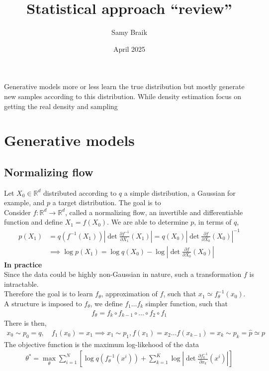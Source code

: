 \documentclass{article}
\title{Statistical approach ``review''}
\author{Samy Braik}
\date{April 2025}
\begin{document}
\maketitle

Generative models more or less learn the true distribution but mostly generate new samples according to this distribution. While density estimation focus on getting the real density and sampling 
\section{Generative models}
\subsection{Normalizing flow}
Let $X_0\in\mathbb{R}^d$ distributed according to $q$ a simple distribution, a Gaussian for example, and $p$ a target distribution.  The goal is to 
\\
Consider $f:\mathbb{R}^d\rightarrow\mathbb{R}^d$, called a normalizing flow, an invertible and differentiable function and define $X_1=f(X_0)$. 
We are able to determine \(p\), in terms of \(q\), 
\begin{align}
    p(X_1)&=q(f^{-1}(X_1))\left| \det\frac{\partial f^{-1}}{\partial X_1}(X_1) \right| = q(X_0)\left| \det \frac{\partial f}{\partial X_0}(X_0) \right|^{-1} \\
    &\implies \log p(X_1)=\log q(X_0) - \log \left|  \det \frac{\partial f}{\partial X_0}(X_0) \right|  
\end{align}
\textbf{In practice} \\
Since the data could be highly non-Gaussian in nature, such a transformation $f$ is intractable.\\
Therefore the goal is to learn $f_\theta$, approximation of $f$, such that $x_1 \simeq f_\theta^{-1}(x_0)$. \\
A structure is imposed to $f_\theta$, we define $f_1\ldots f_k$ simpler function,  such that
\begin{align}
    f_\theta = f_k\circ f_{k-1}\circ\ldots\circ f_2\circ f_1
\end{align}
There is then, 
\begin{align}
    x_0\sim p_0=q, \quad f_1(x_0) = x_1 \implies x_1\sim p_1, f(x_1)=x_2 \ldots f(x_{k-1})=x_k \sim p_k = \hat{p} \simeq p
\end{align}
The objective function is the maximum log-likehood of the data
\begin{align}
    \theta^* = \max_{\theta} \sum_{i=1}^N \left[ \log q(f_\theta^{-1}(x^i)) + \sum_{k=1}^K \log \left| \det\frac{\partial f_k^{-1}}{\partial x_k}(x^i) \right| \right] 
\end{align}
\end{document}
